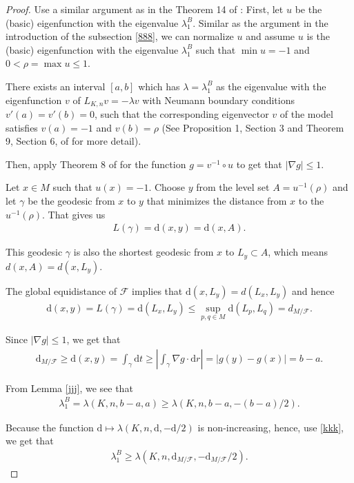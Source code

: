 \documentclass[11pt]{amsart}
\def\d{\mathrm{d}}
\begin{document}
\begin{proof}
   Use a similar argument as in the Theorem 14 of \cite{bakryqian}: First, let $u$ be the (basic) eigenfunction with the eigenvalue $\lambda_1^B$. Similar as the argument in the introduction of the subsection \ref{888}, we can normalize $u$ and assume $u$ is the (basic) eigenfunction with the eigenvalue $\lambda_1^B$ such that $\min u=-1$ and $0<\rho=\max u\leq 1$. 

There exists an interval $[a,b]$ which has $\lambda=\lambda_1^B$ as the eigenvalue with the eigenfunction $v$ of $L_{K,n}v=-\lambda v$ with Neumann boundary conditions $v'(a)=v'(b)=0$, such that the corresponding eigenvector $v$ of the model satisfies $v(a)=-1$ and $v(b)=\rho$ (See Proposition 1, Section 3 and Theorem 9, Section 6, of \cite{bakryqian} for more detail).

  Then, apply Theorem 8 of \cite{bakryqian} for the function $g=v^{-1}\circ u$ to get that  $\vert \nabla g\vert\leq 1$. 
   
   Let $x\in M$ such that $u(x)=-1$. Choose $y$ from the level set $A=u^{-1}(\rho)$ and let $\gamma
        $ be the geodesic from $x$ to $y$ that minimizes the distance from $x$ to the $ u^{-1}(\rho)$. That gives us
        \begin{align}
            L(\gamma)=\d(x,y)=\d(x,A).
        \end{align}

        This geodesic $\gamma$ is also the shortest geodesic from $x$ to $L_y\subset A$, which means $d(x,A)=d(x,L_y)$.

        The global equidistance of $\mathcal{F}$ implies  that $\d(x,L_y)=d(L_x,L_y)$ and hence
        \begin{align}
            \d(x,y)=L(\gamma)=\d(L_x,L_y)\leq\sup_{p,q\in M}\d(L_p,L_q)=d_{M/\mathcal{F}}.
        \end{align}

        Since $\vert\nabla g\vert\leq 1$, we get that\begin{align}\label{kkk}
            \d_{M/\mathcal{F}}\geq\d(x,y)=\int_\gamma \d t\geq\left\vert\int_\gamma\nabla g\cdot \d r\right\vert=\vert g(y)-g(x)\vert=b-a.
        \end{align}

        From Lemma \ref{jjj}, we see that \begin{align*}
            \lambda_1^B=\lambda(K,n,b-a,a)\geq \lambda(K,n,b-a,-(b-a)/2).
        \end{align*}

       Because the function $\d\mapsto\lambda(K,n,\d,-\d/2)$ is non-increasing, hence, use \ref{kkk},  we get that
        \begin{align*}
            \lambda_1^B\geq\lambda(K,n,\d_{M/\mathcal{F}},-\d_{M/\mathcal{F}}/2).
        \end{align*}
\end{proof}
\end{document}
